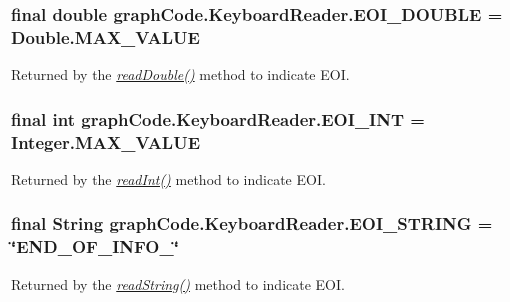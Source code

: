\subsubsection[{\texorpdfstring{E\+O\+I\+\_\+\+D\+O\+U\+B\+LE}{EOI_DOUBLE}}]{\setlength{\rightskip}{0pt plus 5cm}final double graph\+Code.\+Keyboard\+Reader.\+E\+O\+I\+\_\+\+D\+O\+U\+B\+LE = Double.\+M\+A\+X\+\_\+\+V\+A\+L\+UE\hspace{0.3cm}{\ttfamily [static]}}\hypertarget{classgraphCode_1_1KeyboardReader_ad8288436031edae30b500dbb7ac05960}{}\label{classgraphCode_1_1KeyboardReader_ad8288436031edae30b500dbb7ac05960}
Returned by the {\itshape \hyperlink{classgraphCode_1_1KeyboardReader_ac9ff0d97d041350b957dce4822813ba0}{read\+Double()}} method to indicate E\+OI. 
\subsubsection[{\texorpdfstring{E\+O\+I\+\_\+\+I\+NT}{EOI_INT}}]{\setlength{\rightskip}{0pt plus 5cm}final int graph\+Code.\+Keyboard\+Reader.\+E\+O\+I\+\_\+\+I\+NT = Integer.\+M\+A\+X\+\_\+\+V\+A\+L\+UE\hspace{0.3cm}{\ttfamily [static]}}\hypertarget{classgraphCode_1_1KeyboardReader_ad3188717707def9a8e8d6397646365ef}{}\label{classgraphCode_1_1KeyboardReader_ad3188717707def9a8e8d6397646365ef}
Returned by the {\itshape \hyperlink{classgraphCode_1_1KeyboardReader_add978b1e4a585c5d7ab75113af2c42fa}{read\+Int()}} method to indicate E\+OI. 
\subsubsection[{\texorpdfstring{E\+O\+I\+\_\+\+S\+T\+R\+I\+NG}{EOI_STRING}}]{\setlength{\rightskip}{0pt plus 5cm}final String graph\+Code.\+Keyboard\+Reader.\+E\+O\+I\+\_\+\+S\+T\+R\+I\+NG = \char`\"{}E\+N\+D\+\_\+\+O\+F\+\_\+\+I\+N\+F\+O\+\_\char`\"{}\hspace{0.3cm}{\ttfamily [static]}}\hypertarget{classgraphCode_1_1KeyboardReader_ac53bec259e91a7ca66bbc88d358a162b}{}\label{classgraphCode_1_1KeyboardReader_ac53bec259e91a7ca66bbc88d358a162b}
Returned by the {\itshape \hyperlink{classgraphCode_1_1KeyboardReader_a675b8013d5093b880c8988ca4e4dacd8}{read\+String()}} method to indicate E\+OI. 
